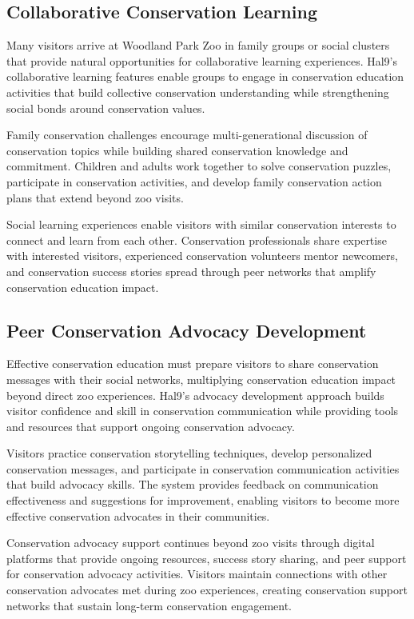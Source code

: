 \documentclass[
  Letterpaper,
]{scrbook}
\begin{document}
\subsection{Collaborative Conservation
Learning}\label{collaborative-conservation-learning}

Many visitors arrive at Woodland Park Zoo in family groups or social
clusters that provide natural opportunities for collaborative learning
experiences. Hal9's collaborative learning features enable groups to
engage in conservation education activities that build collective
conservation understanding while strengthening social bonds around
conservation values.

Family conservation challenges encourage multi-generational discussion
of conservation topics while building shared conservation knowledge and
commitment. Children and adults work together to solve conservation
puzzles, participate in conservation activities, and develop family
conservation action plans that extend beyond zoo visits.

Social learning experiences enable visitors with similar conservation
interests to connect and learn from each other. Conservation
professionals share expertise with interested visitors, experienced
conservation volunteers mentor newcomers, and conservation success
stories spread through peer networks that amplify conservation education
impact.

\subsection{Peer Conservation Advocacy
Development}\label{peer-conservation-advocacy-development}

Effective conservation education must prepare visitors to share
conservation messages with their social networks, multiplying
conservation education impact beyond direct zoo experiences. Hal9's
advocacy development approach builds visitor confidence and skill in
conservation communication while providing tools and resources that
support ongoing conservation advocacy.

Visitors practice conservation storytelling techniques, develop
personalized conservation messages, and participate in conservation
communication activities that build advocacy skills. The system provides
feedback on communication effectiveness and suggestions for improvement,
enabling visitors to become more effective conservation advocates in
their communities.

Conservation advocacy support continues beyond zoo visits through
digital platforms that provide ongoing resources, success story sharing,
and peer support for conservation advocacy activities. Visitors maintain
connections with other conservation advocates met during zoo
experiences, creating conservation support networks that sustain
long-term conservation engagement.
\end{document}
